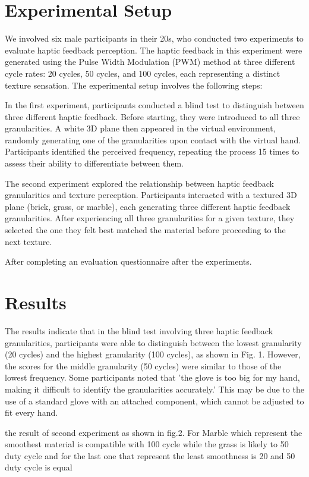 \documentclass[a4paper,twocolumn]{article}
\begin{document}
\section{Experimental Setup}
We involved six male participants in their 20s, who conducted two experiments to evaluate haptic feedback perception. The haptic feedback in this experiment were generated using the Pulse Width Modulation (PWM) method at three different cycle rates: 20 cycles, 50 cycles, and 100 cycles, each representing a distinct texture sensation. The experimental setup involves the following steps: \par
In the first experiment, participants conducted a blind test to distinguish between three different haptic feedback. Before starting, they were introduced to all three granularities. A white 3D plane then appeared in the virtual environment, randomly generating one of the granularities upon contact with the virtual hand. Participants identified the perceived frequency, repeating the process 15 times to assess their ability to differentiate between them.\par
The second experiment explored the relationship between haptic feedback granularities and texture perception. Participants interacted with a textured 3D plane (brick, grass, or marble), each generating three different haptic feedback granularities. After experiencing all three granularities for a given texture, they selected the one they felt best matched the material before proceeding to the next texture.\par
After completing an evaluation questionnaire after the experiments. 					

\section{Results}
The results indicate that in the blind test involving three haptic feedback granularities, participants were able to distinguish between the lowest granularity (20 cycles) and the highest granularity (100 cycles), as shown in Fig. 1. However, the scores for the middle granularity (50 cycles) were similar to those of the lowest frequency. Some participants noted that 'the glove is too big for my hand, making it difficult to identify the granularities accurately.' This may be due to the use of a standard glove with an attached component, which cannot be adjusted to fit every hand.\par
the result of second experiment as shown in fig.2. For Marble which represent the smoothest material is compatible with 100 cycle while the grass is likely to 50 duty cycle and for the last one that represent the least smoothness is 20 and 50 duty cycle is equal
\end{document}
